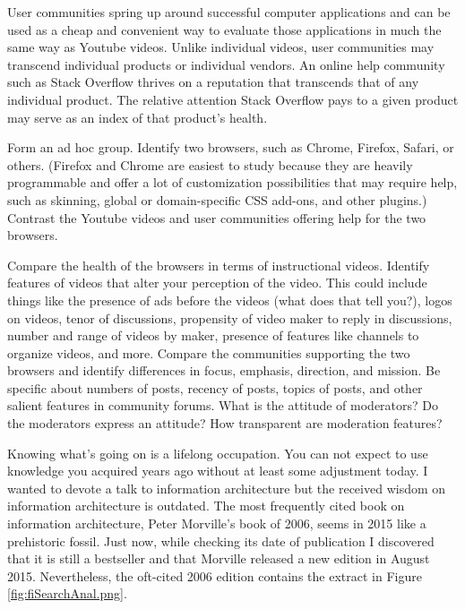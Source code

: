 User communities spring up around successful computer applications and
can be used as a cheap and convenient way to evaluate those applications
in much the same way as Youtube videos. Unlike individual videos, user
communities may transcend individual products or individual vendors. An
online help community such as Stack Overflow thrives on a reputation
that transcends that of any individual product. The relative attention
Stack Overflow pays to a given product may serve as an index of that
product's health.

\hypertarget{exercise-comparing-help-for-two-browsers}{%
\label{exercise-comparing-help-for-two-browsers}}

Form an ad hoc group. Identify two browsers, such as Chrome, Firefox,
Safari, or others. (Firefox and Chrome are easiest to study because they
are heavily programmable and offer a lot of customization possibilities
that may require help, such as skinning, global or domain-specific CSS
add-ons, and other plugins.) Contrast the Youtube videos and user
communities offering help for the two browsers.

Compare the health of the browsers in terms of instructional videos.
Identify features of videos that alter your perception of the video.
This could include things like the presence of ads before the videos
(what does that tell you?), logos on videos, tenor of discussions,
propensity of video maker to reply in discussions, number and range of
videos by maker, presence of features like channels to organize videos,
and more. Compare the communities supporting the two browsers and
identify differences in focus, emphasis, direction, and mission. Be
specific about numbers of posts, recency of posts, topics of posts, and
other salient features in community forums. What is the attitude of
moderators? Do the moderators express an attitude? How transparent are
moderation features?

\hypertarget{navigating-information}{%
\label{navigating-information}}

\noindent Knowing what's going on is a lifelong occupation. You can not
expect to use knowledge you acquired years ago without at least some
adjustment today. I wanted to devote a talk to information architecture
but the received wisdom on information architecture is outdated. The
most frequently cited book on information architecture, Peter Morville's
book of 2006, seems in 2015 like a prehistoric fossil. Just now, while
checking its date of publication I discovered that it is still a
bestseller and that Morville released a new edition in August 2015.
Nevertheless, the oft-cited 2006 edition contains the extract in Figure
\ref{fig:fiSearchAnal.png}.

